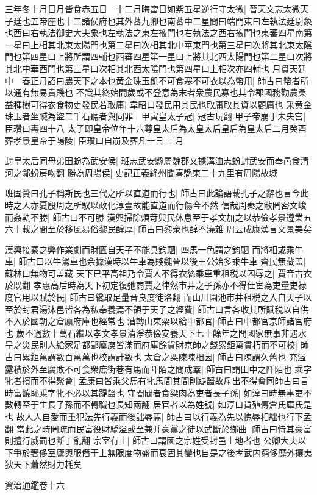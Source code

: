 三年冬十月日月皆食赤五日　十二月晦雷日如紫五星逆行守太微|{
	晉天文志太微天子廷也五帝座也十二諸侯府也其外蕃九卿也南蕃中二星間曰端門東曰左執法廷尉象也西曰右執法御史大夫象也左執法之東左掖門也右執法之西右掖門也東蕃四星南第一星曰上相其北東太陽門也第二星曰次相其北中華東門也第三星曰次將其北東太隂門也第四星曰上將所謂四輔也西蕃四星第一星曰上將其北西太陽門也第二星曰次將其北中華西門也第三星曰次相其北西太隂門也第四星曰上相次亦四輔也}
月貫天廷中　春正月詔曰農天下之本也黄金珠玉飢不可食寒不可衣以為幣用|{
	師古曰幣者所以通有無易貴賤也}
不識其終始間歲或不登意為末者衆農民寡也其令郡國務勸農桑益種樹可得衣食物吏發民若取庸|{
	韋昭曰發民用其民也取庸取其資以顧庸也}
采黄金珠玉者坐贓為盜二千石聽者與同罪　甲寅皇太子冠|{
	冠古玩翻}
甲子帝崩于未央宫|{
	臣瓚曰夀四十八}
太子即皇帝位年十六尊皇太后為太皇太后皇后為皇太后二月癸酉葬孝景皇帝于陽陵|{
	臣瓚曰自崩及葬凡十日}
三月

封皇太后同母弟田蚡為武安侯|{
	班志武安縣屬魏郡又據溝洫志蚡封武安而奉邑食清河之鄃蚡房吻翻}
勝為周陽侯|{
	史記正義絳州聞喜縣東二十九里有周陽故城}


班固贊曰孔子稱斯民也三代之所以直道而行也|{
	師古曰此論語載孔子之辭也言今此時之人亦夏殷周之所馭以政化淳壹故能直道而行傷今不然}
信哉周秦之敝罔密文峻而姦軌不勝|{
	師古曰不可勝}
漢興掃除煩苛與民休息至于孝文加之以恭儉孝景遵業五六十載之間至於移風易俗黎民醇厚|{
	師古曰黎衆也醇不澆雜}
周云成康漢言文景美矣

漢興接秦之弊作業劇而財匱自天子不能具鈞駟|{
	四馬一色謂之鈞駟}
而將相或乘牛車|{
	師古曰以牛駕車也余據漢時以牛車為賤魏晉以後王公始多乘牛車}
齊民無藏盖|{
	蘇林曰無物可盖藏}
天下已平高祖乃令賈人不得衣絲乘車重租税以困辱之|{
	賈音古衣於既翻}
孝惠高后時為天下初定復弛商賈之律然市井之子孫亦不得仕宦為吏量吏禄度官用以賦於民|{
	師古曰纔取足量音良度徒洛翻}
而山川園池市井租税之入自天子以至於封君湯沐邑皆各為私奉養焉不領于天子之經費|{
	師古曰言各收其所賦税以自供不入於國朝之倉廪府庫也經常也}
漕轉山東粟以給中都官|{
	師古曰中都官京師諸官府也}
歲不過數十萬石繼以孝文孝景清淨恭儉安養天下七十餘年之間國家無事非遇水旱之災民則人給家足都鄙廩庾皆滿而府庫餘貨財京師之錢累鉅萬貫朽而不可校|{
	師古曰累鉅萬謂數百萬萬也校謂計數也}
太倉之粟陳陳相因|{
	師古曰陳謂久舊也}
充溢露積於外至腐敗不可食衆庶街巷有馬而阡陌之間成羣|{
	師古曰謂田中之阡陌也}
乘字牝者擯而不得聚會|{
	孟康曰皆乘父馬有牝馬間其間則踶齧故斥出不得會同師古曰言時富饒恥乘字牝不必以其踶齧也}
守閭閻者食粱肉為吏者長子孫|{
	如淳曰時無事吏不數轉至于生長子孫而不轉職也長知兩翻}
居官者以為姓號|{
	如淳曰貨殖傳倉氏庫氏是也}
故人人自愛而重犯法先行義而後詘辱焉|{
	師古曰以行義為先以愧辱相絀也行下孟翻}
當此之時罔疏而民富役財驕溢或至兼并豪黨之徒以武斷於鄉曲|{
	師古曰恃其豪富則擅行威罰也斷丁亂翻}
宗室有土|{
	師古曰謂國之宗姓受封邑土地者也}
公卿大夫以下爭於奢侈室廬輿服僭于上無限度物盛而衰固其變也自是之後孝武内窮侈靡外攘夷狄天下蕭然財力耗矣

資治通鑑卷十六
